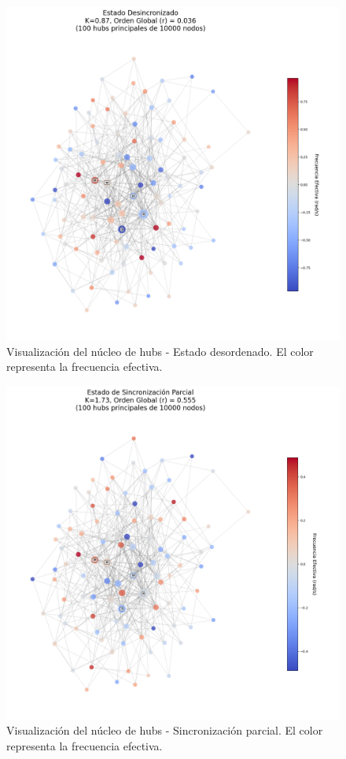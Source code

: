 \documentclass[12pt, a4paper]{article}
\begin{document}
\begin{figure}[htbp]
    \centering
    \includegraphics[width=\textwidth]{img/3_1.png}
    \caption{Visualización del núcleo de hubs - Estado desordenado. El color representa la frecuencia efectiva.}
    \label{fig:hubs_a}
\end{figure}

\begin{figure}[htbp]
    \centering
    \includegraphics[width=\textwidth]{img/3_2.png}
    \caption{Visualización del núcleo de hubs - Sincronización parcial. El color representa la frecuencia efectiva.}
    \label{fig:hubs_b}
\end{figure}
\end{document}
